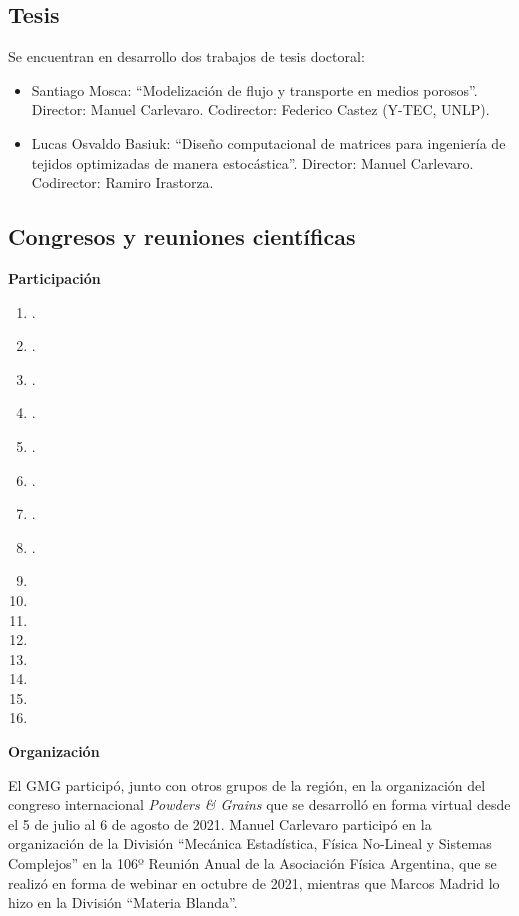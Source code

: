 \documentclass[a4paper,11pt,twoside,final,titlepage,onecolumn,openright]{report}
\begin{document}
\subsection{Tesis}

Se encuentran en desarrollo dos trabajos de tesis doctoral:
\begin{itemize}
 \item Santiago Mosca: ``Modelización de flujo y transporte en medios porosos''. Director: Manuel Carlevaro. Codirector: Federico Castez (Y-TEC, UNLP).
 \item Lucas Osvaldo Basiuk: ``Diseño computacional de matrices para ingeniería de tejidos optimizadas de manera estocástica''. Director: Manuel Carlevaro. Codirector: Ramiro Irastorza.
\end{itemize}


\subsection{Congresos y reuniones científicas}

{\bf Participación}

\begin{enumerate}
\item {}.
\item {}.
\item {}.
\item {}.
\item {}.
\item {}.
\item {}.
\item {}.
\item {}
\item {}
\item {}
\item {}
\item {}
\item {}
\item {}
\item {}
\end{enumerate}

\vspace{0.25cm}
{\bf Organización}
\vspace{0.5cm}

El GMG participó, junto con otros grupos de la región, en la organización del congreso internacional \textit{Powders \& Grains} que se desarrolló en forma virtual desde el 5 de julio al 6 de agosto de 2021. Manuel Carlevaro participó en la organización de la División ``Mecánica Estadística, Física No-Lineal y Sistemas Complejos'' en la 106º Reunión Anual de la Asociación Física Argentina, que se realizó en forma de webinar en octubre de 2021, mientras que Marcos Madrid lo hizo en la División ``Materia Blanda''.
\end{document}
